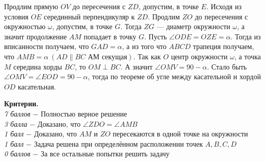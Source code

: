 Продлим прямую $OV$ до пересечения с $ZD$, допустим, в точке $E$. Исходя из условия $OE$ серединный перпендикуляр к $ZD$. Продлим $ZO$ до пересечения с окружностью $\omega$, допустим, в точке $G$. Тогда $ZG$ --- диаметр окружности $\omega$, а значит продолжение $AM$ попадает в точку $G$. Пусть $\angle ODE = OZE = \alpha$. Тогда из вписанности получаем, что $GAD = \alpha$, а из того что $ABCD$ трапеция получаем, что $AMB = \alpha \ (AD \| BC \text{ АМ секущая}).$ Так как $O$ центр окружности $\omega$, а точка $M$ середина хорды $BC$, то $OM \perp BC$. А значит $\angle OMV = 90 - \alpha$. Стало быть $\angle OMV = \angle EOD = 90 - \alpha$, тогда по теореме об угле между касательной и хордой $OD$ касательная.

\textbf{Критерии.}\\
\textit{7 баллов} $-$ Полностью верное решение\\
\textit{3 балла} $-$ Доказано, что $\angle ZDO = \angle AMB$\\
\textit{1 балл} $-$ Доказано, что $AM$ и $ZO$ пересекаются в одной точке на окружности\\
\textit{1 балл} $-$ Задача решена при определённом расположении точек $A,B,C,D$\\
\textit{0 баллов} $-$ За все остальные попытки решить задачу\\